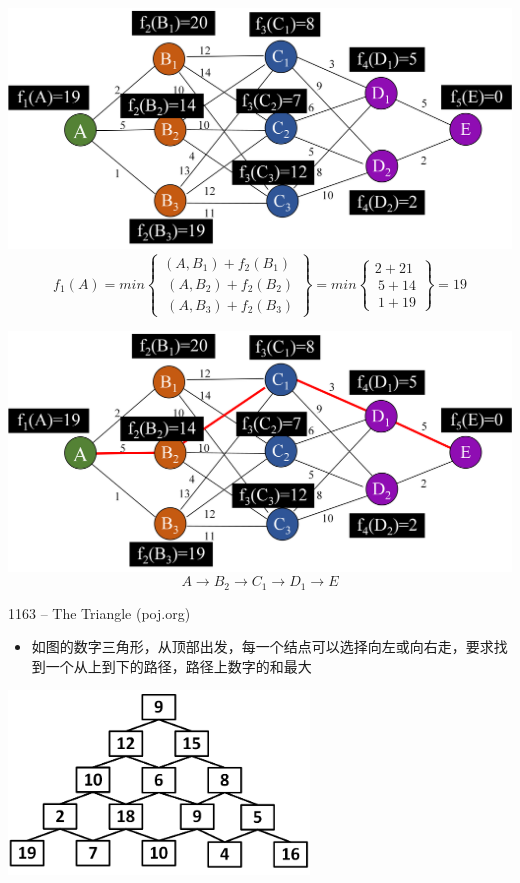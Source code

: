 \begin{frame}
    \includegraphics[width=\textwidth]{fig/dp8.png}
    $$f_1(A)=min \begin{Bmatrix}(A,B_1)+f_2(B_1)\\\ (A,B_2)+f_2(B_2)\\\ (A,B_3)+f_2(B_3) \end{Bmatrix} =min \begin{Bmatrix}2+21\\\ 5+14\\\ 1+19 \end{Bmatrix} =19$$
\end{frame}
\begin{frame}
    \includegraphics[width=\textwidth]{fig/dp9.png}
    $$A\rightarrow B_2\rightarrow C_1 \rightarrow D_1 \rightarrow E$$
\end{frame}
\begin{frame}{1163 -- The Triangle (poj.org)}
    \begin{itemize}
        \item 如图的数字三角形，从顶部出发，每一个结点可以选择向左或向右走，要求找到一个从上到下的路径，路径上数字的和最大
    \end{itemize}
    \vfill
    \includegraphics[width=0.6\textwidth,center]{fig/4-3.png}
\end{frame}
